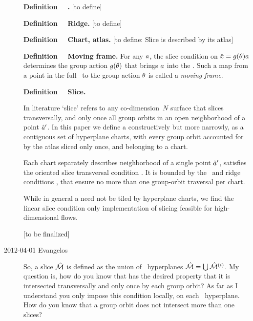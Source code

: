 \begin{description}
\textbf{Definition~~}
\textbf{\ChartBord.}
[to define]

\textbf{Definition~~}
\textbf{Ridge.}
[to define]

\textbf{Definition~~}
\textbf{Chart, atlas.}
[to define: Slice is described by its
atlas]

\textbf{Definition~~}
\label{def:movingFrame}
\textbf{Moving frame.}
For any $a$, the slice condition  on $\hat{x} =
g(\theta)a$ determines the group action $g(\theta)$ that
brings $ a$ into the \slice.
Such a map from a point in the full \statesp\ to the group action
$\theta$ is called a \emph{moving
frame}.

\textbf{Definition~~}
\textbf{Slice.}

In literature `slice' refers to any co-dimension~$N$ surface
that slices transversally, and only once all group orbits in an open
neighborhood  of a {\template} point $\hat{a}'$. In this paper we define a
{\slice} constructively but more narrowly, as a contiguous set of
hyperplane charts, with every group orbit accounted for by the atlas
sliced only once, and belonging to a chart.

Each chart separately describes neighborhood of a single {\template}
point $\hat{a}'$, satisfies the oriented slice transversal condition
. It is bounded by the \chartBord\ and ridge conditions
,  that ensure no more than one
group-orbit traversal per chart.

While in general a {\slice} need not be tiled by hyperplane charts,
we find the linear slice condition  only implementation
of slicing feasible for high-dimensional flows.

[to be finalized]

\item[2012-04-01 Evangelos] So, a slice $\hat{\cal M}$ is defined as the union of
\slice\ hyperplanes $\hat{\cal M}=\bigcup\hat{\cal M}{}^{(i)}$. My question is, how do you know
that \pSRed has the desired property that it is intersected transversally and only once
by each group orbit? As far as I understand you only impose this condition locally, on each
\slice\ hyperplane. How do you know that a group orbit does not intersect more than
one slices?


\end{description}
